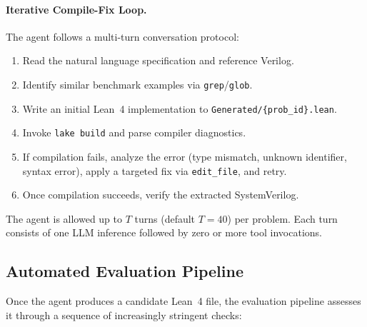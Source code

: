 \paragraph{Iterative Compile-Fix Loop.}
The agent follows a multi-turn conversation protocol:
\begin{enumerate}[leftmargin=*,itemsep=0pt,topsep=2pt]
    \item Read the natural language specification and reference Verilog.
    \item Identify similar benchmark examples via \texttt{grep}/\texttt{glob}.
    \item Write an initial Lean~4 implementation to \texttt{Generated/\{prob\_id\}.lean}.
    \item Invoke \texttt{lake build} and parse compiler diagnostics.
    \item If compilation fails, analyze the error (type mismatch, unknown identifier, syntax error), apply a targeted fix via \texttt{edit\_file}, and retry.
    \item Once compilation succeeds, verify the extracted SystemVerilog.
\end{enumerate}
The agent is allowed up to $T$ turns (default $T{=}40$) per problem. Each turn consists of one LLM inference followed by zero or more tool invocations.

\subsection{Automated Evaluation Pipeline}
\label{sec:eval_pipeline}

Once the agent produces a candidate Lean~4 file, the evaluation pipeline assesses it through a sequence of increasingly stringent checks:

